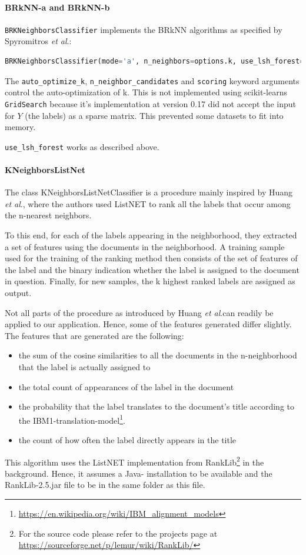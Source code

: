 \documentclass{article}
\newcommand\etal{\textit{et al}.\;}
\begin{document}
\paragraph{BRkNN-a and BRkNN-b}
\texttt{BRKNeighborsClassifier} implements the BRkNN algorithms as specified by Spyromitros \etal \cite{spyromitros2008empirical}:
\begin{lstlisting}[language=Python]
 BRKNeighborsClassifier(mode='a', n_neighbors=options.k, use_lsh_forest=options.lshf, algorithm='brute', metric='cosine', auto_optimize_k=options.grid_search)
 \end{lstlisting}
The \texttt{auto\_optimize\_k},  \texttt{n\_neighbor\_candidates} and \texttt{scoring} keyword arguments control the auto-optimization of k.
This is not implemented using scikit-learns \texttt{GridSearch} because it's implementation at version 0.17 did
not accept the input for $Y$ (the labels) as a sparse matrix.
This prevented some datasets to fit into memory.

\texttt{use\_lsh\_forest} works as described above.
\paragraph{KNeighborsListNet}
The class KNeighborsListNetClassifier is a procedure mainly inspired by Huang \etal \cite{huang2011recommending},
where the authors used ListNET to rank all the labels that occur among the n-nearest neighbors.

To this end, for each of the labels appearing in the neighborhood, they extracted a set of features using the documents
in the neighborhood. A training sample used for the training of the ranking method then consists of the set of features of the label
and the binary indication whether the label is assigned to the document in question.
Finally, for new samples, the k highest ranked labels are assigned as output.

Not all parts of the procedure as introduced by Huang \etal can readily be applied to our application. Hence, some of the
features generated differ slightly.
The features that are generated are the following:
\begin{itemize}
  \item the sum of the cosine similarities to all the documents in the n-neighborhood that the label is actually assigned to
  \item the total count of appearances of the label in the document
  \item the probability that the label translates to the document's title according to the IBM1-translation-model\footnote{
  \url{https://en.wikipedia.org/wiki/IBM_alignment_models}}.
  \item the count of how often the label directly appears in the title
\end{itemize}
This algorithm uses the ListNET implementation from
RankLib\footnote{For the source code please refer to the projects page at \url{https://sourceforge.net/p/lemur/wiki/RankLib/}}
in the background. Hence, it assumes a Java-
installation to be available and the RankLib-2.5.jar file to be in the same folder as this file.
\end{document}
